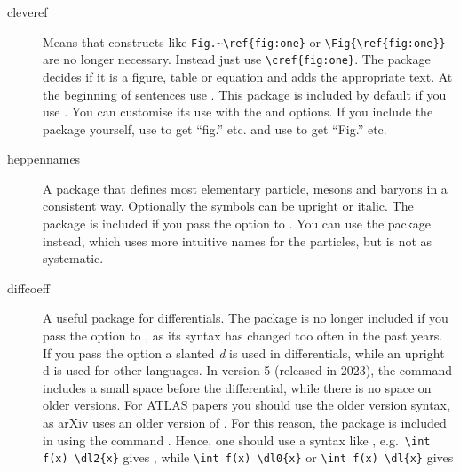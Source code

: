 \begin{description}
  \item[cleveref] Means that constructs like \verb|Fig.~\ref{fig:one}| or
  \verb|\Fig{\ref{fig:one}}| are no longer necessary.
  Instead just use \verb|\cref{fig:one}|.
  The package decides if it is a figure, table or equation and
  adds the appropriate text.
  At the beginning of sentences use .
  This package is included by default if you use .
  You can customise its use with the  and  options.
  If you include the package yourself, use  to get \enquote{fig.} etc. and
  use  to get \enquote{Fig.} etc.

  \item[heppennames] A package that defines most elementary particle, mesons and baryons in a
  consistent way. Optionally the symbols can be upright or italic.
  The package is included if you pass the option  to .
  You can use the package  instead, which uses more intuitive names for the particles,
  but is not as systematic.

  \item[diffcoeff] A useful package for differentials.
   The package is no longer included if you pass the option  to ,
  as its syntax has changed too often in the past years.
  If you pass the option 
  a slanted \textit{d} is used in differentials,
  while an upright \textrm{d} is used for other languages.
  In version 5 (released in 2023), the  command includes a small space before the differential,
  while there is no space on older versions.
  For ATLAS papers you should use the older version syntax, as arXiv uses an older version of .
  For this reason, the package is included in  using the command
  .
  Hence, one should use a syntax like ,
  e.g.\ \verb|\int f(x) \dl2{x}| gives
  ,
  while \verb|\int f(x) \dl0{x}| or \verb|\int f(x) \dl{x}| gives  
  

\end{description}
